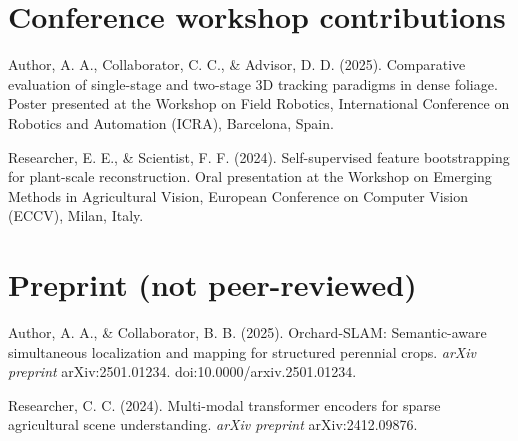 \section*{Conference workshop contributions}

Author, A. A., Collaborator, C. C., \& Advisor, D. D. (2025). Comparative evaluation of single-stage and two-stage 3D tracking paradigms in dense foliage. Poster presented at the Workshop on Field Robotics, International Conference on Robotics and Automation (ICRA), Barcelona, Spain.

Researcher, E. E., \& Scientist, F. F. (2024). Self-supervised feature bootstrapping for plant-scale reconstruction. Oral presentation at the Workshop on Emerging Methods in Agricultural Vision, European Conference on Computer Vision (ECCV), Milan, Italy.

\section*{Preprint (not peer-reviewed)}

Author, A. A., \& Collaborator, B. B. (2025). Orchard-SLAM: Semantic-aware simultaneous localization and mapping for structured perennial crops. \textit{arXiv preprint} arXiv:2501.01234. doi:10.0000/arxiv.2501.01234.

Researcher, C. C. (2024). Multi-modal transformer encoders for sparse agricultural scene understanding. \textit{arXiv preprint} arXiv:2412.09876.